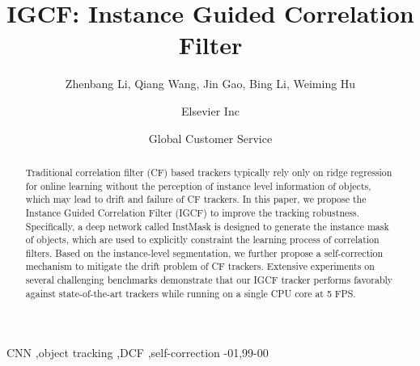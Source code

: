 \documentclass[review]{elsarticle}
\begin{document}
\begin{frontmatter}

\title{IGCF: Instance Guided Correlation Filter}

\author{Zhenbang Li, Qiang Wang, Jin Gao, Bing Li, Weiming Hu}
\address{Radarweg 29, Amsterdam}

\author[mymainaddress,mysecondaryaddress]{Elsevier Inc}

\author[mysecondaryaddress]{Global Customer Service}

\address[mymainaddress]{1600 John F Kennedy Boulevard, Philadelphia}
\address[mysecondaryaddress]{360 Park Avenue South, New York}

\begin{abstract}
Traditional correlation filter (CF) based trackers typically rely only on ridge regression for online learning without the perception of instance level information of objects, which may lead to drift and failure of CF trackers. In this paper, we propose the Instance Guided Correlation Filter (IGCF) to improve the tracking robustness. Specifically, a deep network called InstMask is designed to generate the instance mask of objects, which are used to explicitly constraint the learning process of correlation filters. Based on the instance-level segmentation, we further propose a self-correction mechanism to mitigate the drift problem of CF trackers. Extensive experiments on several challenging benchmarks demonstrate that our IGCF tracker performs favorably against state-of-the-art trackers while running on a single CPU core at 5 FPS.
\end{abstract}

\begin{keyword}
CNN \sep object tracking \sep DCF \sep self-correction
-01\sep  99-00
\end{keyword}

\end{frontmatter}

\linenumbers
\end{document}
